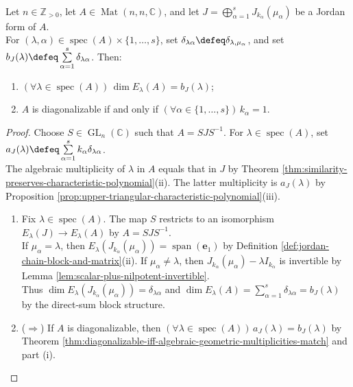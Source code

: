 \begin{corollary} \label{cor:jordan-blocks-diagonalizability} \\
Let $n\in\mathbb{Z}_{>0}$, let $A\in\operatorname{Mat}(n,n,\mathbb{C})$, and let $J=\bigoplus\limits_{\alpha=1}^s J_{k_{\alpha}}(\mu_{\alpha})$ be a Jordan form of $A$.\\
For $(\lambda,\alpha)\in\operatorname{spec}(A)\times\{1,\ldots,s\}$, set $\delta_{\lambda\alpha}\defeq\delta_{\lambda,\mu_{\alpha}}$, and set $b_J(\lambda)\defeq\sum\limits_{\alpha=1}^s\delta_{\lambda\alpha}$. Then:
\begin{enumerate}[label=(\roman*)]
\setlength{\itemsep}{0pt}
\item $(\forall\lambda\in\operatorname{spec}(A))\,\dim E_{\lambda}(A)=b_J(\lambda)$;
\item $A$ is diagonalizable if and only if $(\forall\alpha\in\{1,\ldots,s\})\,k_{\alpha}=1$.
\end{enumerate}
\begin{proof}
Choose $S\in\operatorname{GL}_n(\mathbb{C})$ such that $A=SJS^{-1}$. For $\lambda\in\operatorname{spec}(A)$, set $a_J(\lambda)\defeq\sum\limits_{\alpha=1}^{s}k_{\alpha}\delta_{\lambda\alpha}$.\\
The algebraic multiplicity of $\lambda$ in $A$ equals that in $J$ by Theorem \ref{thm:similarity-preserves-characteristic-polynomial}(ii). The latter multiplicity is $a_J(\lambda)$ by Proposition \ref{prop:upper-triangular-characteristic-polynomial}(iii).
\begin{enumerate}[label=(\roman*)]
\setlength{\itemsep}{0pt}
\item[$(i)$] Fix $\lambda\in\operatorname{spec}(A)$. The map $S$ restricts to an isomorphism $E_{\lambda}(J)\to E_{\lambda}(A)$ by $A=SJS^{-1}$.\\
If $\mu_{\alpha}=\lambda$, then $E_{\lambda}(J_{k_{\alpha}}(\mu_{\alpha}))=\operatorname{span}(\mathbf{e}_1)$ by Definition \ref{def:jordan-chain-block-and-matrix}(ii). If $\mu_{\alpha}\neq\lambda$, then $J_{k_{\alpha}}(\mu_{\alpha})-\lambda I_{k_{\alpha}}$ is invertible by Lemma \ref{lem:scalar-plus-nilpotent-invertible}.\\
Thus $\dim E_{\lambda}(J_{k_{\alpha}}(\mu_{\alpha}))=\delta_{\lambda\alpha}$ and $\dim E_{\lambda}(A)=\sum\limits_{\alpha=1}^{s}\delta_{\lambda\alpha}=b_J(\lambda)$ by the direct-sum block structure.
\item[$(ii)$] ($\Rightarrow$) If $A$ is diagonalizable, then $(\forall\lambda\in\operatorname{spec}(A))\,a_J(\lambda)=b_J(\lambda)$ by Theorem \ref{thm:diagonalizable-iff-algebraic-geometric-multiplicities-match} and part (i).\\

\end{enumerate}
\end{proof}
\end{corollary}
